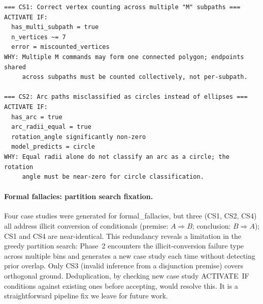 \documentclass{article}
\begin{document}
\begin{lstlisting}[caption={Phase-2 case studies generated for geometric\_shapes (v3). ACTIVATE
  IF conditions encode structural SVG parsing rules intended to generalise across model families
  (narrow predicates such as \texttt{n\_vertices}$\approx$7 limit scope):
  under Gemini training, these rules benefit GPT-4.1 ($+4.0$\,pp) and Gemini ($+5.0$\,pp).},
  label={lst:gs_cs}]
=== CS1: Correct vertex counting across multiple "M" subpaths ===
ACTIVATE IF:
  has_multi_subpath = true
  n_vertices ~= 7
  error = miscounted_vertices
WHY: Multiple M commands may form one connected polygon; endpoints shared
     across subpaths must be counted collectively, not per-subpath.

=== CS2: Arc paths misclassified as circles instead of ellipses ===
ACTIVATE IF:
  has_arc = true
  arc_radii_equal = true
  rotation_angle significantly non-zero
  model_predicts = circle
WHY: Equal radii alone do not classify an arc as a circle; the rotation
     angle must be near-zero for circle classification.
\end{lstlisting}

\paragraph{Formal fallacies: partition search fixation.}
Four case studies were generated for formal\_fallacies, but three (CS1, CS2, CS4) all address
illicit conversion of conditionals (premise: $A\!\Rightarrow\!B$; conclusion:
$B\!\Rightarrow\!A$); CS1 and CS4 are near-identical.
This redundancy reveals a limitation in the greedy partition search: Phase~2 encounters the
illicit-conversion failure type across multiple bins and generates a new case study each time
without detecting prior overlap.
Only CS3 (invalid inference from a disjunction premise) covers orthogonal ground.
Deduplication, by checking new case study ACTIVATE~IF conditions against existing ones before
accepting, would resolve this. It is a straightforward pipeline fix we leave for future work.
\end{document}
